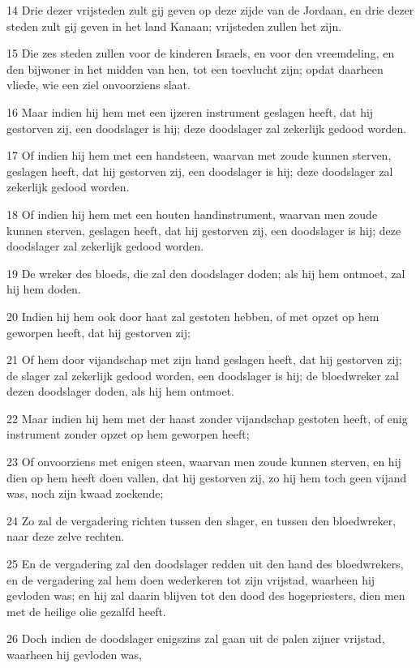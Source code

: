 \par 14 Drie dezer vrijsteden zult gij geven op deze zijde van de Jordaan, en drie dezer steden zult gij geven in het land Kanaan; vrijsteden zullen het zijn.
\par 15 Die zes steden zullen voor de kinderen Israels, en voor den vreemdeling, en den bijwoner in het midden van hen, tot een toevlucht zijn; opdat daarheen vliede, wie een ziel onvoorziens slaat.
\par 16 Maar indien hij hem met een ijzeren instrument geslagen heeft, dat hij gestorven zij, een doodslager is hij; deze doodslager zal zekerlijk gedood worden.
\par 17 Of indien hij hem met een handsteen, waarvan met zoude kunnen sterven, geslagen heeft, dat hij gestorven zij, een doodslager is hij; deze doodslager zal zekerlijk gedood worden.
\par 18 Of indien hij hem met een houten handinstrument, waarvan men zoude kunnen sterven, geslagen heeft, dat hij gestorven zij, een doodslager is hij; deze doodslager zal zekerlijk gedood worden.
\par 19 De wreker des bloeds, die zal den doodslager doden; als hij hem ontmoet, zal hij hem doden.
\par 20 Indien hij hem ook door haat zal gestoten hebben, of met opzet op hem geworpen heeft, dat hij gestorven zij;
\par 21 Of hem door vijandschap met zijn hand geslagen heeft, dat hij gestorven zij; de slager zal zekerlijk gedood worden, een doodslager is hij; de bloedwreker zal dezen doodslager doden, als hij hem ontmoet.
\par 22 Maar indien hij hem met der haast zonder vijandschap gestoten heeft, of enig instrument zonder opzet op hem geworpen heeft;
\par 23 Of onvoorziens met enigen steen, waarvan men zoude kunnen sterven, en hij dien op hem heeft doen vallen, dat hij gestorven zij, zo hij hem toch geen vijand was, noch zijn kwaad zoekende;
\par 24 Zo zal de vergadering richten tussen den slager, en tussen den bloedwreker, naar deze zelve rechten.
\par 25 En de vergadering zal den doodslager redden uit den hand des bloedwrekers, en de vergadering zal hem doen wederkeren tot zijn vrijstad, waarheen hij gevloden was; en hij zal daarin blijven tot den dood des hogepriesters, dien men met de heilige olie gezalfd heeft.
\par 26 Doch indien de doodslager enigszins zal gaan uit de palen zijner vrijstad, waarheen hij gevloden was,

